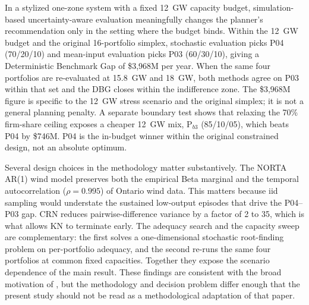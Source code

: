 \documentclass[11pt]{article}
\begin{document}
In a stylized one-zone system with a fixed 12~GW capacity budget, simulation-based uncertainty-aware evaluation meaningfully changes the planner's recommendation only in the setting where the budget binds. Within the 12~GW budget and the original 16-portfolio simplex, stochastic evaluation picks P04 (70/20/10) and mean-input evaluation picks P03 (60/30/10), giving a Deterministic Benchmark Gap of \$3{,}968M per year. When the same four portfolios are re-evaluated at 15.8~GW and 18~GW, both methods agree on P03 within that set and the DBG closes within the indifference zone. The \$3{,}968M figure is specific to the 12~GW stress scenario and the original simplex; it is not a general planning penalty. A separate boundary test shows that relaxing the 70\% firm-share ceiling exposes a cheaper 12~GW mix, P$_{b3}$ (85/10/05), which beats P04 by \$746M. P04 is the in-budget winner within the original constrained design, not an absolute optimum.

Several design choices in the methodology matter substantively. The NORTA AR(1) wind model preserves both the empirical Beta marginal and the temporal autocorrelation ($\rho = 0.995$) of Ontario wind data. This matters because iid sampling would understate the sustained low-output episodes that drive the P04--P03 gap. CRN reduces pairwise-difference variance by a factor of 2 to 35, which is what allows KN to terminate early. The adequacy search and the capacity sweep are complementary: the first solves a one-dimensional stochastic root-finding problem on per-portfolio adequacy, and the second re-runs the same four portfolios at common fixed capacities. Together they expose the scenario dependence of the main result. These findings are consistent with the broad motivation of \citet{ParkBaldick2016}, but the methodology and decision problem differ enough that the present study should not be read as a methodological adaptation of that paper.
\end{document}

